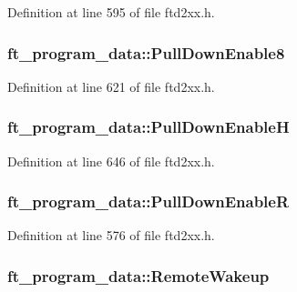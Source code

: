 Definition at line 595 of file ftd2xx.h.\hypertarget{structft__program__data_a54a83cacd2ba6f2963d3b71716c1023e}{
\subsubsection[{PullDownEnable8}]{ {\bf ft\_\-program\_\-data::PullDownEnable8}}}
\label{structft__program__data_a54a83cacd2ba6f2963d3b71716c1023e}


Definition at line 621 of file ftd2xx.h.\hypertarget{structft__program__data_af8a338b21c048bb0e585162bd491761e}{
\subsubsection[{PullDownEnableH}]{ {\bf ft\_\-program\_\-data::PullDownEnableH}}}
\label{structft__program__data_af8a338b21c048bb0e585162bd491761e}


Definition at line 646 of file ftd2xx.h.\hypertarget{structft__program__data_a78a9293c320445bb93f54b166b81305c}{
\subsubsection[{PullDownEnableR}]{ {\bf ft\_\-program\_\-data::PullDownEnableR}}}
\label{structft__program__data_a78a9293c320445bb93f54b166b81305c}


Definition at line 576 of file ftd2xx.h.\hypertarget{structft__program__data_ace6f9b75bffa94d7926296734f5b227f}{
\subsubsection[{RemoteWakeup}]{ {\bf ft\_\-program\_\-data::RemoteWakeup}}}
\label{structft__program__data_ace6f9b75bffa94d7926296734f5b227f}


